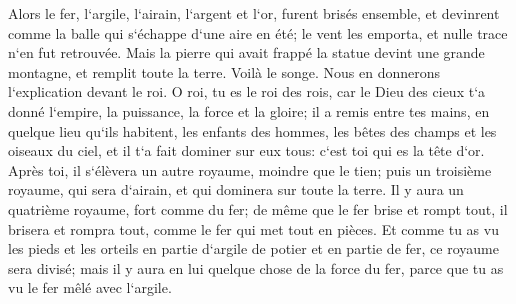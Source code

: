 \verse Alors le fer, l`argile, l`airain, l`argent et l`or, furent brisés ensemble, et devinrent comme la balle qui s`échappe d`une aire en été; le vent les emporta, et nulle trace n`en fut retrouvée. Mais la pierre qui avait frappé la statue devint une grande montagne, et remplit toute la terre. 
\verse Voilà le songe. Nous en donnerons l`explication devant le roi. 
\verse O roi, tu es le roi des rois, car le Dieu des cieux t`a donné l`empire, la puissance, la force et la gloire; 
\verse il a remis entre tes mains, en quelque lieu qu`ils habitent, les enfants des hommes, les bêtes des champs et les oiseaux du ciel, et il t`a fait dominer sur eux tous: c`est toi qui es la tête d`or. 
\verse Après toi, il s`élèvera un autre royaume, moindre que le tien; puis un troisième royaume, qui sera d`airain, et qui dominera sur toute la terre. 
\verse Il y aura un quatrième royaume, fort comme du fer; de même que le fer brise et rompt tout, il brisera et rompra tout, comme le fer qui met tout en pièces. 
\verse Et comme tu as vu les pieds et les orteils en partie d`argile de potier et en partie de fer, ce royaume sera divisé; mais il y aura en lui quelque chose de la force du fer, parce que tu as vu le fer mêlé avec l`argile. 
